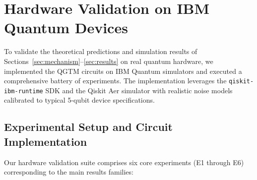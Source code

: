 %  
%  

\section{Hardware Validation on IBM Quantum Devices}
\label{sec:hardware}

To validate the theoretical predictions and simulation results 
of Sections~\ref{sec:mechanism}--\ref{sec:results} on real quantum hardware,
we implemented the QGTM circuits on IBM Quantum simulators and executed a 
comprehensive battery of experiments. The implementation leverages the 
\texttt{qiskit-ibm-runtime} SDK and the Qiskit Aer simulator with realistic 
noise models calibrated to typical 5-qubit device specifications.

\subsection{Experimental Setup and Circuit Implementation}
\label{subsec:hw_setup}

Our hardware validation suite comprises six core experiments (E1 through E6) 
corresponding to the main results families:

